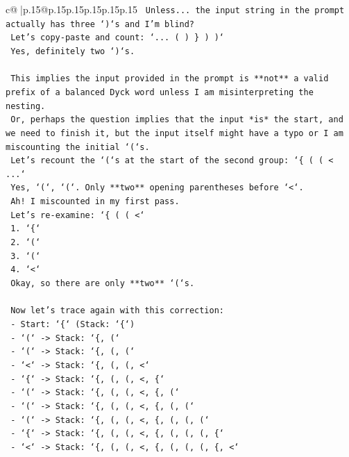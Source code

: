 \documentclass{article}
\begin{document}
{\begin{supertabular}{c@{$\;$}|p{.15\linewidth}@{}p{.15\linewidth}p{.15\linewidth}p{.15\linewidth}p{.15\linewidth}p{.15\linewidth}}
{{{\texttt{      Unless... the input string in the prompt actually has three `)`s and I'm blind?} \\
\texttt{      Let's copy{-}paste and count: `... ( ) \} ) )`} \\
\texttt{      Yes, definitely two `)`s.} \\
\\ 
\texttt{      This implies the input provided in the prompt is **not** a valid prefix of a balanced Dyck word unless I am misinterpreting the nesting.} \\
\texttt{      Or, perhaps the question implies that the input *is* the start, and we need to finish it, but the input itself might have a typo or I am miscounting the initial `(`s.} \\
\texttt{      Let's recount the `(`s at the start of the second group: `\{ ( ( < ...`} \\
\texttt{      Yes, `(`, `(`. Only **two** opening parentheses before `<`.} \\
\texttt{      Ah! I miscounted in my first pass.} \\
\texttt{      Let's re{-}examine: `\{ ( ( <`} \\
\texttt{      1. `\{`} \\
\texttt{      2. `(`} \\
\texttt{      3. `(`} \\
\texttt{      4. `<`} \\
\texttt{      Okay, so there are only **two** `(`s.} \\
\\ 
\texttt{      Now let's trace again with this correction:} \\
\texttt{      {-} Start: `\{` (Stack: `\{`)} \\
\texttt{      {-} `(` {-}> Stack: `\{, (`} \\
\texttt{      {-} `(` {-}> Stack: `\{, (, (`} \\
\texttt{      {-} `<` {-}> Stack: `\{, (, (, <`} \\
\texttt{      {-} `\{` {-}> Stack: `\{, (, (, <, \{`} \\
\texttt{      {-} `(` {-}> Stack: `\{, (, (, <, \{, (`} \\
\texttt{      {-} `(` {-}> Stack: `\{, (, (, <, \{, (, (`} \\
\texttt{      {-} `(` {-}> Stack: `\{, (, (, <, \{, (, (, (`} \\
\texttt{      {-} `\{` {-}> Stack: `\{, (, (, <, \{, (, (, (, \{`} \\
\texttt{      {-} `<` {-}> Stack: `\{, (, (, <, \{, (, (, (, \{, <`} \\
}}}
\end{supertabular}}
\end{document}
